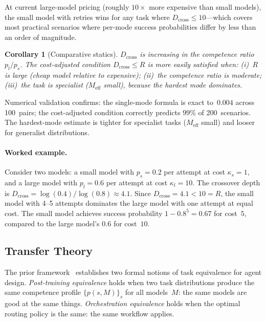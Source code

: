 \documentclass[twoside,11pt]{article}
\newtheorem{corollary}{Corollary}
\newcommand{\Meff}{M_{\mathrm{eff}}}
\newcommand{\Dcross}{D_{\mathrm{cross}}}
\begin{document}
At current large-model pricing (roughly $10\times$ more expensive than small models), the small model with retries wins for any task where $\Dcross \le 10$---which covers most practical scenarios where per-mode success probabilities differ by less than an order of magnitude.

\begin{corollary}[Comparative statics]
\label{cor:crossover-statics}
$\Dcross$ is increasing in the competence ratio $p_l/p_s$.
The cost-adjusted condition $\Dcross \le R$ is more easily satisfied when: (i)~$R$ is large (cheap model relative to expensive); (ii)~the competence ratio is moderate; (iii)~the task is specialist ($\Meff$ small), because the hardest mode dominates.
\end{corollary}

Numerical validation confirms: the single-mode formula is exact to~$0.004$ across 100~pairs; the cost-adjusted condition correctly predicts 99\% of 200~scenarios.
The hardest-mode estimate is tighter for specialist tasks ($\Meff$ small) and looser for generalist distributions.

\paragraph{Worked example.}
Consider two models: a small model with $p_s = 0.2$ per attempt at cost $\kappa_s = 1$, and a large model with $p_l = 0.6$ per attempt at cost $\kappa_l = 10$.
The crossover depth is $\Dcross = \log(0.4)/\log(0.8) \approx 4.1$.
Since $\Dcross = 4.1 < 10 = R$, the small model with 4--5 attempts dominates the large model with one attempt at equal cost.
The small model achieves success probability $1 - 0.8^5 = 0.67$ for cost~$5$, compared to the large model's $0.6$ for cost~$10$.

\subsection{Transfer Theory}
\label{sec:transfer}


The prior framework~\citep{beneventano2026framework} establishes two formal notions of task equivalence for agent design.
\emph{Post-training equivalence} holds when two task distributions produce the same competence profile $\{p(s,M)\}_s$ for all models~$M$: the same models are good at the same things.
\emph{Orchestration equivalence} holds when the optimal routing policy is the same: the same workflow applies.
\end{document}
